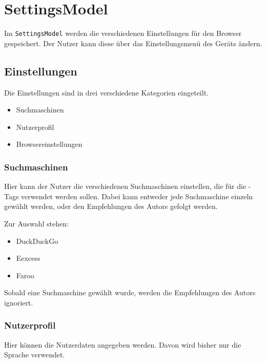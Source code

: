 
\section{SettingsModel}
Im \lstinline|SettingsModel| werden die verschiedenen Einstellungen für den Browser gespeichert. Der Nutzer kann diese über das Einstellungsmenü des Geräts ändern.

\subsection{Einstellungen}  
Die Einstellungen sind in drei verschiedene Kategorien eingeteilt.

\begin{itemize}  
     \item Suchmaschinen  
     \item Nutzerprofil
     \item Browsereinstellungen
\end{itemize}

\subsubsection{Suchmaschinen}  
Hier kann der Nutzer die verschiedenen Suchmaschinen einstellen, die für die \SEARCH-Tags verwendet werden sollen. Dabei kann entweder jede Suchmaschine einzeln gewählt werden, oder den Empfehlungen des Autors gefolgt werden.

Zur Auswahl stehen:
\begin{itemize}  
     \item DuckDuckGo
     \item Eexcess
     \item Faroo  
\end{itemize}

Sobald eine Suchmaschine gewählt wurde, werden die Empfehlungen des Autors ignoriert.

\subsubsection{Nutzerprofil}  
Hier können die Nutzerdaten angegeben werden. Davon wird bisher nur die Sprache verwendet.

